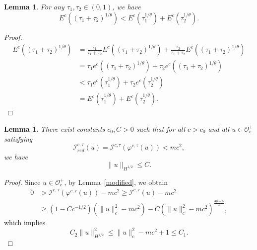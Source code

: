 \documentclass{amsart}
\theoremstyle{plain}
\newtheorem{lemma}[theorem]{Lemma}
\theoremstyle{definition}
\theoremstyle{remark}
\numberwithin{equation}{section} \numberwithin{figure}{section}
\begin{document}
\begin{lemma}\label{lemm:3.8}
 For any $\tau_1, \tau_2 \in (0, 1)$, we have
 \[
 E^c((\tau_1 + \tau_2)^{1/\theta}) < E^c(\tau_1^{1/\theta}) + E^c(\tau_2^{1/\theta}).
 \]
\end{lemma}

\begin{proof}
  \[
  \begin{aligned}
    E^c((\tau_1 + \tau_2)^{1/\theta})
    &= \frac{\tau_1}{\tau_1 + \tau_2} E^c((\tau_1 + \tau_2)^{1/\theta}) + \frac{\tau_2}{\tau_1 + \tau_2} E^c((\tau_1 + \tau_2)^{1/\theta}) \\
    &= \tau_1 e^c((\tau_1 + \tau_2)^{1/\theta}) + \tau_2 e^c((\tau_1 + \tau_2)^{1/\theta}) \\
    &< \tau_1 e^c(\tau_1^{1/\theta}) + \tau_2 e^c(\tau_2^{1/\theta}) \\
    &= E^c(\tau_1^{1/\theta}) + E^c(\tau_2^{1/\theta}).
  \end{aligned}
  \]
\end{proof}

\begin{lemma}\label{lo}
  There exist constants $c_0, C > 0$ such that for all $c > c_0$ and all $u \in \mathcal{O}_c^+$ satisfying
  \[
  \mathcal{I}_{{red}}^{c,\tau}(u) = \mathcal{I}^{c, \tau}(\varphi^{c, \tau}(u)) < m c^2,
  \]
  we have
  \[
  \|u\|_{H^{1/2}} \leq C.
  \]
\end{lemma}

\begin{proof}
  Since $u \in \mathcal{O}_c^+$, by Lemma~\ref{modified}, we obtain
  \[
  \begin{split}
    0 &> \mathcal{I}^{c, \tau}(\varphi^{c, \tau}(u)) - m c^2 \geq \mathcal{I}^{c, \tau}(u) - m c^2 \\
    &\geq (1 - C c^{-1/2})(\|u\|_c^2 - m c^2) - C (\|u\|_c^2 - m c^2)^{\frac{3p - 6}{4}},
  \end{split}
  \]
  which implies
  \[
  C_2 \|u\|_{H^{1/2}}^2 \leq \|u\|_c^2 - m c^2 + 1 \leq C_1.
  \]
\end{proof}
\end{document}
